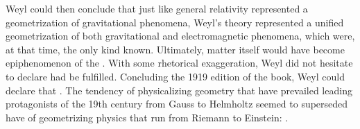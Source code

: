 {Weyl could then conclude that just like general relativity represented a geometrization of gravitational phenomena, Weyl's theory represented a unified geometrization of both gravitational and electromagnetic phenomena, which were, at that time, the only kind known. Ultimately, matter itself would have become epiphenomenon of the . With some rhetorical exaggeration, Weyl did not hesitate to declare  had be fulfilled. Concluding the 1919 edition of the book, Weyl could declare that . The tendency of physicalizing geometry that have prevailed leading protagonists of the 19th century from Gauss to Helmholtz seemed to superseded have of geometrizing physics that run from Riemann to Einstein:  \citep[263]{Weyl1919}. 









}
